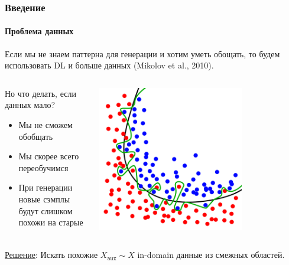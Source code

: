 \documentclass[10pt]{beamer}
\begin{document}
\begin{frame}
\frametitle{Введение}
\framesubtitle{Проблема данных}

Если мы не знаем паттерна для генерации и хотим уметь обощать, то будем использовать DL и больше данных (Mikolov et al., 2010). \\

\begin{columns}
    \begin{column}{0.5\textwidth}
        Но что делать, если данных мало?
        \begin{itemize}
            \item Мы не сможем обобщать 
            \item Мы скорее всего переобучимся
            \item При генерации новые сэмплы будут слишком похожи на старые
        \end{itemize}
    \end{column}
    \begin{column}{0.5\textwidth}
        \begin{center}
            \includegraphics[width=0.7\textwidth]{images/overfitting.png}
        \end{center}
    \end{column}
\end{columns}

\vskip4mm

\underline{Решение}: Искать похожие $X_{\texttt{aux}} \sim X$ in-domain данные из смежных областей.

\end{frame}
\end{document}
